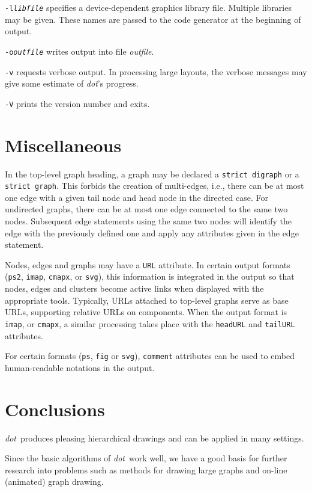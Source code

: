 \documentclass[11pt]{article}
\def\dot{{\it dot}}
\begin{document}
{{\tt-l{\it libfile}} specifies a device-dependent graphics library
file. Multiple libraries may be given. These names are passed to the code
generator at the beginning of output. 

{\tt-o{\it outfile}} writes output into file {\it outfile}.

\verb"-v" requests verbose output.  In processing large layouts,
the verbose messages may give some estimate of \dot's progress.

\verb"-V" prints the version number and exits.

\section{Miscellaneous}

In the top-level graph heading, a graph may be declared a
{\tt strict digraph} or a {\tt strict graph}. This forbids the creation 
of multi-edges, i.e., there can be at most one edge with a given tail
node and head node in the directed case. For undirected graphs, 
there can be at most one
edge connected to the same two nodes. Subsequent edge statements using
the same two nodes will identify the edge with the previously defined one
and apply any attributes given in the edge statement.

Nodes, edges and graphs may have a {\tt URL} attribute. In certain
output formats ({\tt ps2}, {\tt imap}, {\tt cmapx}, or {\tt svg}), 
this information is integrated in the output 
so that nodes, edges and clusters become active links
when displayed with the appropriate tools. Typically, URLs attached to
top-level graphs serve as base URLs, supporting relative URLs on
components. When the output format is {\tt imap}, or {\tt cmapx},
a similar processing
takes place with the {\tt headURL} and {\tt tailURL} attributes.

For certain formats ({\tt ps}, {\tt fig} 
or {\tt svg}), {\tt comment} attributes can be used to
embed human-readable notations in the output.

\section{Conclusions}

\dot\ produces pleasing hierarchical drawings and can be
applied in many settings.

Since the basic algorithms of \dot\ work well, we have a good basis for
further research into problems such as methods for drawing large graphs
and on-line (animated) graph drawing.

}
\end{document}
